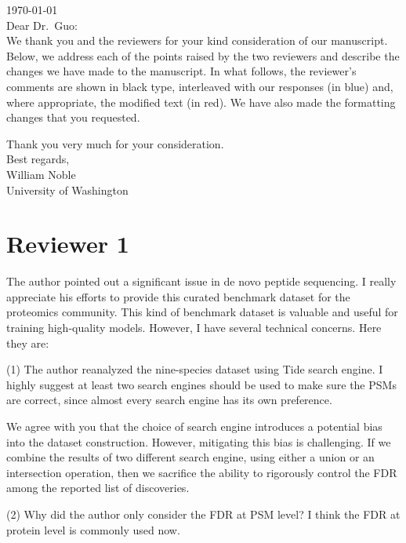 \documentclass{article}
\newcommand{\response}[1]{\vspace*{1ex} \color{blue} \noindent #1 \color{black}
	\vspace*{2ex}}
\begin{document}
\noindent
\today\\[2ex]

\noindent
Dear Dr.\ Guo:\\[2ex]

We thank you and the reviewers for your kind consideration of our manuscript.
Below, we address each of the points raised by the two reviewers and describe the changes we have made to the manuscript.
In what follows, the reviewer's comments are shown in black type, interleaved with our responses (in blue) and, where appropriate, the modified text (in red).
We have also made the formatting changes that you requested.

Thank you very much for your consideration.\\[2ex]

\noindent
Best regards,\\[2ex]

\noindent
William Noble\\
University of Washington

\clearpage
\section*{Reviewer 1}

The author pointed out a significant issue in de novo peptide sequencing. I really appreciate his efforts to provide this curated benchmark dataset for the proteomics community. This kind of benchmark dataset is valuable and useful for training high-quality models. However, I have several technical concerns. Here they are:

(1) The author reanalyzed the nine-species dataset using Tide search engine. I highly suggest at least two search engines should be used to make sure the PSMs are correct, since almost every search engine has its own preference.

\response{We agree with you that the choice of search engine introduces a potential bias into the dataset construction.
  However, mitigating this bias is challenging.
  If we combine the results of two different search engine, using either a union or an intersection operation, then we sacrifice the ability to rigorously control the FDR among the reported list of discoveries.}

(2) Why did the author only consider the FDR at PSM level? I think the FDR at protein level is commonly used now.
\end{document}

